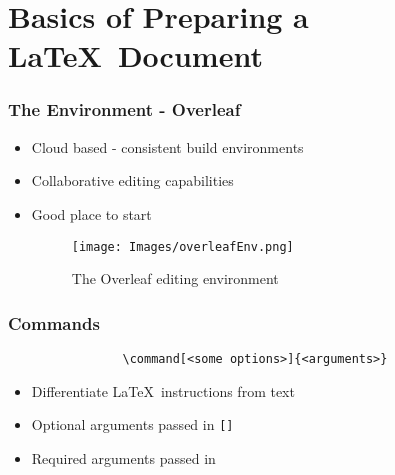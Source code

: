 \documentclass{beamer}
\begin{document}
    \section{Basics of Preparing a \LaTeX~Document}
        \begin{frame}
            \frametitle{The Environment - Overleaf}
            \begin{itemize}
                \item Cloud based - consistent build environments
                \item Collaborative editing capabilities
                \item Good place to start
                \begin{figure}
                    \begin{centering}
                        \texttt{[image: Images/overleafEnv.png]}
                        \caption{The Overleaf editing environment}
                        \label{fig:overleafEnv}
                    \end{centering}
                \end{figure}
            \end{itemize}
        \end{frame}
        \begin{frame}[fragile]
            \frametitle{Commands}
            \begin{verbatim}
                \command[<some options>]{<arguments>}
            \end{verbatim}
            \begin{itemize}
                \item Differentiate \LaTeX~instructions from text
                \item Optional arguments passed in \texttt{[]}
                \item Required arguments passed in \texttt{{}}
            \end{itemize}
        \end{frame}
\end{document}
